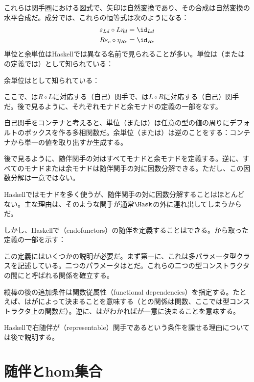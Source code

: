 \noindent
これらは関手圏における図式で、矢印は自然変換であり、その合成は自然変換の水平合成だ。成分では、これらの恒等式は次のようになる：
\begin{gather*}
  \varepsilon_{L d} \circ L \eta_d = \id_{L d} \\
  R \varepsilon_{c} \circ \eta_{R c} = \id_{R c}
\end{gather*}
単位と余単位はHaskellでは異なる名前で見られることが多い。単位は（またはの定義では）として知られている：

余単位はとして知られている：

ここで、は$R \circ L$に対応する（自己）関手で、は$L \circ R$に対応する（自己）関手だ。後で見るように、それぞれモナドと余モナドの定義の一部をなす。

自己関手をコンテナと考えると、単位（または）は任意の型の値の周りにデフォルトのボックスを作る多相関数だ。余単位（または）は逆のことをする：コンテナから単一の値を取り出すか生成する。

後で見るように、随伴関手の対はすべてモナドと余モナドを定義する。逆に、すべてのモナドまたは余モナドは随伴関手の対に因数分解できる。ただし、この因数分解は一意ではない。

Haskellではモナドを多く使うが、随伴関手の対に因数分解することはほとんどない。主な理由は、そのような関手が通常$\Hask$の外に連れ出してしまうからだ。

しかし、Haskellで（endofunctors）の随伴を定義することはできる。から取った定義の一部を示す：

この定義にはいくつかの説明が必要だ。まず第一に、これは多パラメータ型クラスを記述している。二つのパラメータはとだ。これらの二つの型コンストラクタの間にと呼ばれる関係を確立する。

縦棒の後の追加条件は関数従属性（functional dependencies）を指定する。たとえば、はがによって決まることを意味する（との関係は関数、ここでは型コンストラクタ上の関数だ）。逆に、はがわかればが一意に決まることを意味する。

Haskellで右随伴が（representable）関手であるという条件を課せる理由については後で説明する。

\section{随伴とhom集合}

